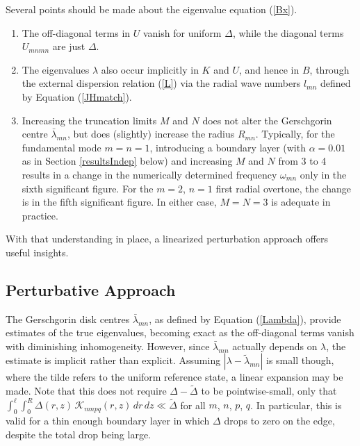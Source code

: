 \documentclass[12pt]{iopart}
\renewcommand{\L}{{\ell}}
\begin{document}
Several points should be made about the eigenvalue equation (\ref{Bx}).
\begin{enumerate}
\item The off-diagonal terms in $U$ vanish for uniform $\Delta$, while the diagonal terms $U_{mnmn}$ are just $\Delta$.
\item The eigenvalues $\lambda$ also occur implicitly in $K$ and $U$, and hence in $B$, through the external dispersion relation (\ref{L}) via the radial wave numbers $l_{mn}$ defined by Equation (\ref{JHmatch}).
\item Increasing the truncation limits $M$ and $N$ does not alter the Gerschgorin centre {$\bar\lambda_{mn}$}, but does (slightly) increase the radius $R_{mn}$. Typically, for the fundamental mode $m=n=1$, introducing a boundary layer (with $\alpha=0.01$ as in Section \ref{resultsIndep} below) and increasing $M$ and $N$ from 3 to 4 results in a change in the numerically determined frequency $\omega_{mn}$ only in the sixth significant figure. For the $m=2$, $n=1$ first radial overtone, the change is in the fifth significant figure. In either case, $M=N=3$ is adequate in practice.
\end{enumerate}

With that understanding in place, a linearized perturbation approach offers useful insights.



\subsection{Perturbative Approach}
The Gerschgorin disk centres $\bar\lambda_{mn}$, as defined by Equation (\ref{Lambda}), provide estimates of the true eigenvalues, becoming exact as the off-diagonal terms vanish with diminishing inhomogeneity. However, since $\bar\lambda_{mn}$ actually depends on $\lambda$, the estimate is implicit rather than explicit. Assuming $|\lambda-\tilde\lambda_{mn}|$ is small though, where the tilde refers to the uniform reference state, a linear expansion may be made. Note that this does not require $\Delta-\tilde\Delta$ to be pointwise-small, only that $\int_0^\L\!\!\int_0^R  \Delta(r,z)\,\mathcal{K}_{mnpq}(r,z)\,dr\,dz\ll \tilde\Delta$ for all $m$, $n$, $p$, $q$. In particular, this is valid for a thin enough boundary layer in which $\Delta$ drops to zero on the edge, despite the total drop being large.
\end{document}
